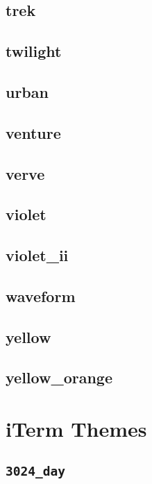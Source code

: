 \subsection{\ttfamily trek}
\newpage
\subsection{\ttfamily twilight\label{section:default}}
\newpage
\subsection{\ttfamily urban}
\newpage
\subsection{\ttfamily venture}
\newpage
\subsection{\ttfamily verve}
\newpage
\subsection{\ttfamily violet}
\newpage
\subsection{\ttfamily violet\_ii}
\newpage
\subsection{\ttfamily waveform}
\newpage
\subsection{\ttfamily yellow}
\newpage
\subsection{\ttfamily yellow\_orange}
\newpage
\section{iTerm Themes}
\subsection{\texttt{3024\_day}}
\newpage
